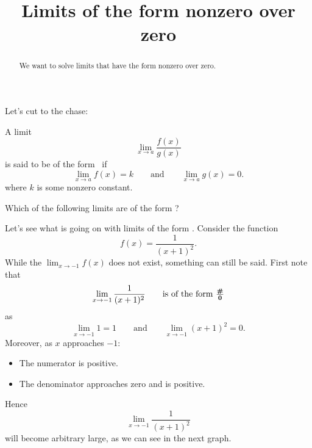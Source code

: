 \documentclass{ximera}
\title[Dig-In:]{Limits of the form nonzero over zero}
\begin{document}
\begin{abstract}
  We want to solve limits that have the form nonzero over zero.
\end{abstract}

\maketitle

Let's cut to the chase:

\begin{definition}
  A limit
  \[
  \lim_{x\to a} \frac{f(x)}{g(x)}
  \]
  is said to be of the form \numOverZero\ if
  \[
  \lim_{x\to a} f(x) = k\qquad\text{and}\qquad \lim_{x\to a} g(x) =0.
  \]
  where $k$ is some nonzero constant.
\end{definition}

\begin{question}
  Which of the following limits are of the form \numOverZero?
  \begin{selectAll}
  \end{selectAll}
\end{question}


Let's see what is going on with limits of the form \numOverZero.
Consider the function
  \[
  f(x) = \frac{1}{(x+1)^2}.
  \]
While the $\lim_{x\to -1} f(x)$ does not exist, something can still be
said. First note that
\[
\lim_{x\to -1} \frac{1}{(x+1)^2}\qquad\text{is of the form $\boldsymbol{\tfrac{\#}{0}}$}
\]
as
\[
\lim_{x\to -1} 1 = 1 \qquad\text{and}\qquad \lim_{x\to -1}(x+1)^2 = 0.
\]
Moreover, as $x$ approaches $-1$:
\begin{itemize}
\item The numerator is positive.
\item The denominator approaches zero and is positive.
\end{itemize}
Hence
\[
\lim_{x\to -1} \frac{1}{(x+1)^2}
\]
will become arbitrary large, as we can see in the next graph.
\begin{image}
\end{image}
\end{document}
